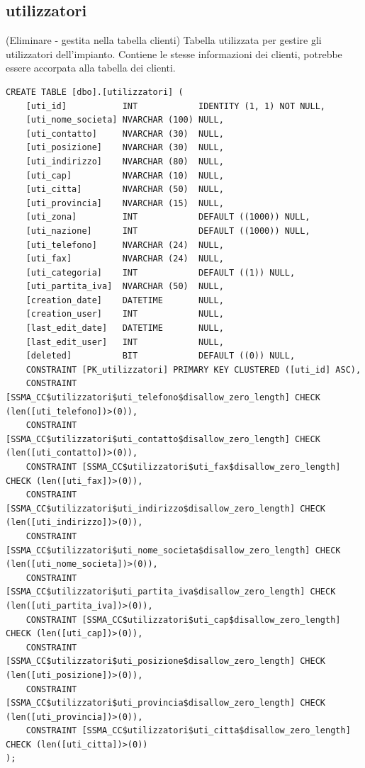 \documentclass[12pt]{article}
\begin{document}
\subsection{utilizzatori}(Eliminare - gestita nella tabella clienti)
Tabella utilizzata per gestire gli utilizzatori dell'impianto.
Contiene le stesse informazioni dei clienti, potrebbe essere accorpata alla tabella dei clienti.
\begin{lstlisting}
CREATE TABLE [dbo].[utilizzatori] (
    [uti_id]           INT            IDENTITY (1, 1) NOT NULL,
    [uti_nome_societa] NVARCHAR (100) NULL,
    [uti_contatto]     NVARCHAR (30)  NULL,
    [uti_posizione]    NVARCHAR (30)  NULL,
    [uti_indirizzo]    NVARCHAR (80)  NULL,
    [uti_cap]          NVARCHAR (10)  NULL,
    [uti_citta]        NVARCHAR (50)  NULL,
    [uti_provincia]    NVARCHAR (15)  NULL,
    [uti_zona]         INT            DEFAULT ((1000)) NULL,
    [uti_nazione]      INT            DEFAULT ((1000)) NULL,
    [uti_telefono]     NVARCHAR (24)  NULL,
    [uti_fax]          NVARCHAR (24)  NULL,
    [uti_categoria]    INT            DEFAULT ((1)) NULL,
    [uti_partita_iva]  NVARCHAR (50)  NULL,
    [creation_date]    DATETIME       NULL,
    [creation_user]    INT            NULL,
    [last_edit_date]   DATETIME       NULL,
    [last_edit_user]   INT            NULL,
    [deleted]          BIT            DEFAULT ((0)) NULL,
    CONSTRAINT [PK_utilizzatori] PRIMARY KEY CLUSTERED ([uti_id] ASC),
    CONSTRAINT [SSMA_CC$utilizzatori$uti_telefono$disallow_zero_length] CHECK (len([uti_telefono])>(0)),
    CONSTRAINT [SSMA_CC$utilizzatori$uti_contatto$disallow_zero_length] CHECK (len([uti_contatto])>(0)),
    CONSTRAINT [SSMA_CC$utilizzatori$uti_fax$disallow_zero_length] CHECK (len([uti_fax])>(0)),
    CONSTRAINT [SSMA_CC$utilizzatori$uti_indirizzo$disallow_zero_length] CHECK (len([uti_indirizzo])>(0)),
    CONSTRAINT [SSMA_CC$utilizzatori$uti_nome_societa$disallow_zero_length] CHECK (len([uti_nome_societa])>(0)),
    CONSTRAINT [SSMA_CC$utilizzatori$uti_partita_iva$disallow_zero_length] CHECK (len([uti_partita_iva])>(0)),
    CONSTRAINT [SSMA_CC$utilizzatori$uti_cap$disallow_zero_length] CHECK (len([uti_cap])>(0)),
    CONSTRAINT [SSMA_CC$utilizzatori$uti_posizione$disallow_zero_length] CHECK (len([uti_posizione])>(0)),
    CONSTRAINT [SSMA_CC$utilizzatori$uti_provincia$disallow_zero_length] CHECK (len([uti_provincia])>(0)),
    CONSTRAINT [SSMA_CC$utilizzatori$uti_citta$disallow_zero_length] CHECK (len([uti_citta])>(0))
);
\end{lstlisting}
\end{document}
